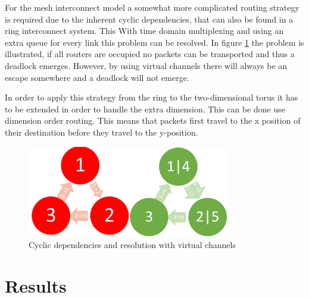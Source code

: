 \documentclass[journal,10pt,twoside, a4paper]{IEEEtran}
\begin{document}
For the mesh interconnect model a somewhat more complicated routing strategy is required due to the inherent cyclic dependencies, that can also be found in a ring interconnect system. This  With time domain multiplexing and using an extra queue for every link this problem can be resolved. In figure \ref{fig:cycDepend} the problem is illustrated, if all routers are occupied no packets can be transported and thus a deadlock emerges. However, by using virtual channels there will always be an escape somewhere and a deadlock will not emerge.

In order to apply this strategy from the ring to the two-dimensional torus it has to be extended in order to handle the extra dimension. This can be done use dimension order routing. This means that packets first travel to the x position of their destination before they travel to the y-position.  

\begin{figure}
    \centering
    \includegraphics[width = 250pt]{cyclic.png}
    \caption{Cyclic dependencies and resolution with virtual channels}
    \label{fig:cycDepend}
\end{figure}



\section{Results}
\end{document}
